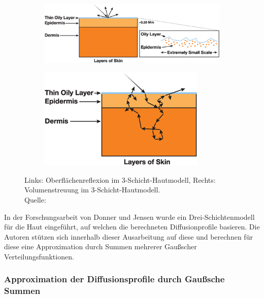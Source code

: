 \documentclass[ngerman,runningheads,a4paper]{llncs}[2018/03/10]
\begin{document}
\begin{figure}
  \centering
  \begin{subfigure}{.5\textwidth}
    \centering
    \includegraphics[scale=0.5,keepaspectratio]{./images/multilayer-skin-specular-reflection.jpg}
    \label{fig:multilayer-specular}
  \end{subfigure}%
  \begin{subfigure}{.5\textwidth}
    \centering
    \includegraphics[scale=0.5,keepaspectratio]{./images/multilayer-skin-subsurface.jpg}
    \label{fig:multilayer-subsurface}
  \end{subfigure}
  \caption{Links: Oberflächenreflexion im 3-Schicht-Hautmodell, Rechts: Volumenstreuung im 3-Schicht-Hautmodell.\\\hspace{\textwidth}Quelle: \cite{advanced-realtime-skin-rendering}}
\end{figure}

In der Forschungsarbeit von Donner und Jensen \cite{spectral-bssrdf-human-skin} wurde ein Drei-Schichtenmodell für die Haut eingeführt, auf welchen die berechneten Diffusionprofile basieren.
Die Autoren \citeauthor{efficient-human-skin-rendering} stützen sich innerhalb dieser Ausarbeitung auf diese und berechnen für diese eine Approximation durch Summen mehrerer Gaußscher Verteilungsfunktionen.

\subsubsection{Approximation der Diffusionsprofile durch Gaußsche Summen}
\end{document}
